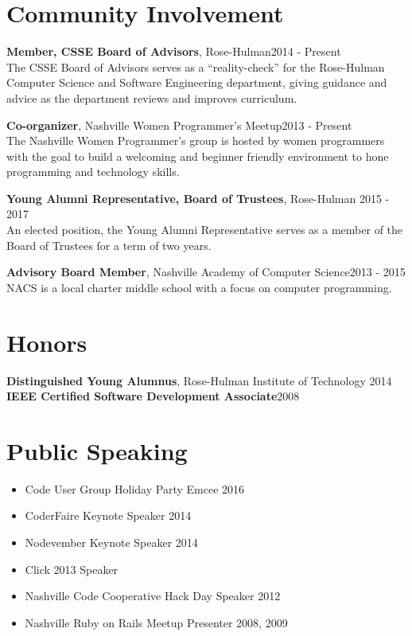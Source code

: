 \documentclass[line, margin, 10pt]{res}
\begin{document}
\begin{resume}
\section{Community Involvement}

{\bf Member, CSSE Board of Advisors}, Rose-Hulman\hfill 2014 - Present\\
The CSSE Board of Advisors serves as a ``reality-check'' for the Rose-Hulman Computer Science and Software Engineering department, giving guidance and advice as the department reviews and improves curriculum.

{\bf Co-organizer}, Nashville Women Programmer's Meetup\hfill 2013 - Present\\
The Nashville Women Programmer's group is hosted by women programmers with the goal to build a welcoming and beginner friendly environment to hone programming and technology skills.

{\bf Young Alumni Representative, Board of Trustees}, Rose-Hulman 2015 - 2017\\
An elected position, the Young Alumni Representative serves as a member of the Board of Trustees for a term of two years.

{\bf Advisory Board Member}, Nashville Academy of Computer Science\hfill 2013 - 2015\\
NACS is a local charter middle school with a focus on computer programming.

\section{Honors}

{\bf Distinguished Young Alumnus}, Rose-Hulman Institute of Technology \hfill 2014\\
{\bf IEEE Certified Software Development Associate}\hfill 2008

\section{Public Speaking}

\begin{itemize}\itemsep -2pt
  \item Code User Group Holiday Party Emcee 2016
  \item CoderFaire Keynote Speaker 2014
  \item Nodevember Keynote Speaker 2014
  \item Click 2013 Speaker
  \item Nashville Code Cooperative Hack Day Speaker 2012
  \item Nashville Ruby on Rails Meetup Presenter 2008, 2009
\end{itemize}


\end{resume}
\end{document}
